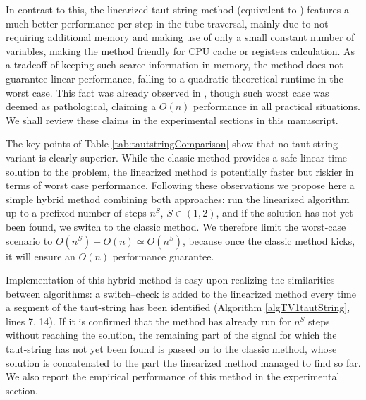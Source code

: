 \documentclass[twoside,11pt]{article}
\numberwithin{equation}{section}
\numberwithin{theorem}{section}
\begin{document}
In contrast to this, the linearized taut-string method (equivalent to \citet{fastTV}) features a much better performance per step in the tube traversal, mainly due to not requiring additional memory and making use of only a small constant number of variables, making the method friendly for CPU cache or registers calculation. As a tradeoff of keeping such scarce information in memory, the method does not guarantee linear performance, falling to a quadratic theoretical runtime in the worst case. This fact was already observed in \citep{fastTV}, though such worst case was deemed as pathological, claiming a $O(n)$ performance in all practical situations. We shall review these claims in the experimental sections in this manuscript.

The key points of Table \ref{tab:tautstringComparison} show that no taut-string variant is clearly superior. While the classic method provides a safe linear time solution to the problem, the linearized method is potentially faster but riskier in terms of worst case performance. Following these observations we propose here a simple hybrid method combining both approaches: run the linearized algorithm up to a prefixed number of steps $n^S$, $S\in(1,2)$, and if the solution has not yet been found, we switch to the classic method. We therefore limit the worst-case scenario to $O(n^S) + O(n) \simeq O(n^S)$, because once the classic method kicks, it will ensure an $O(n)$ performance guarantee.

Implementation of this hybrid method is easy upon realizing the similarities between algorithms: a switch--check is added to the linearized method every time a segment of the taut-string has been identified (Algorithm \ref{algTV1tautString}, lines 7, 14). If it is confirmed that the method has already run for $n^S$ steps without reaching the solution, the remaining part of the signal for which the taut-string has not yet been found is passed on to the classic method, whose solution is concatenated to the part the linearized method managed to find so far. We also report the empirical performance of this method in the experimental section.
\end{document}

